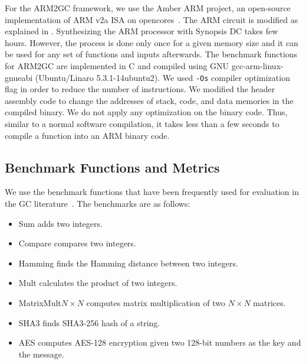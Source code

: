 For the ARM2GC framework, we use the Amber ARM project, an open-source implementation of ARM v2a ISA on opencores~\cite{santifort2010amber}.
The ARM circuit is modified as explained in .
Synthesizing the ARM processor with Synopsis DC takes few hours.
However, the process is done only once for a given memory size and it can be used for any set of functions and inputs afterwards.
The benchmark functions for ARM2GC are implemented in C and compiled using GNU gcc-arm-linux-gnueabi (Ubuntu/Linaro 5.3.1-14ubuntu2).
We used \texttt{-Os} compiler optimization flag in order to reduce the number of instructions.
We modified the header assembly code to change the addresses of stack, code, and data memories in the compiled binary.
We do not apply any optimization on the binary code.
Thus, similar to a normal software compilation, it takes less than a few seconds to compile a function into an ARM binary code.

\subsection{Benchmark Functions and Metrics}
We use the benchmark functions that have been frequently used for evaluation in the GC literature~\cite{holzer2012secure, songhori2015tinygarble, wang2015secure}. The benchmarks are as follows:

\begin{itemize}
\vspace{-0.06in}
\item Sum adds two integers.
\vspace{-0.1in}
\item Compare compares two integers.
\vspace{-0.1in}
\item Hamming finds the Hamming distance between two integers.
\vspace{-0.1in}
\item Mult calculates the product of two integers.
\vspace{-0.1in}
\item MatrixMult$N\times N$ computes matrix multiplication of two $N\times N$ matrices.
\vspace{-0.1in}
\item SHA3 finds SHA3-256 hash of a string.
\vspace{-0.1in}
\item AES computes AES-128 encryption given two 128-bit numbers as the key and the message.
\end{itemize}

